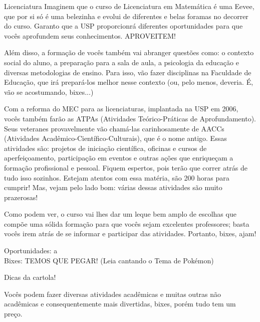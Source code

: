 \begin{subsecao}{Licenciatura}
Imaginem que o curso de Licenciatura em Matemática é uma
Eevee, que por si só é uma belezinha e evolui de diferentes e belas foramas
no decorrer do curso. Garanto que a USP proporcionrá diferentes oportunidades para
que vocês aprofundem seus conhecimentos. APROVEITEM!

Além disso, a formação de vocês também vai abranger questões como: o contexto
social do aluno, a preparação para a sala de aula, a psicologia da educação e
diversas metodologias de ensino. Para isso, vão fazer disciplinas na
Faculdade de Educação, que irá prepará-los melhor nesse contexto (ou, pelo
menos, deveria. É, vão se acostumando, bixes...)

Com a reforma do MEC para as licenciaturas, implantada na USP em 2006,
vocês também farão as ATPAs (Atividades Teórico-Práticas de Aprofundamento).
Seus veteranes provavelmente vão chamá-las carinhosamente de AACCs (Atividades
Acadêmico-Científico-Culturais), que é o nome antigo. Essas atividades são:
projetos de iniciação científica, oficinas e cursos de aperfeiçoamento,
participação em eventos e outras ações que enriqueçam a formação profissional e
pessoal. Fiquem espertos, pois terão que correr atrás de tudo isso sozinhos.
Estejam atentos com essa matéria, são 200 horas para cumprir! Mas, vejam pelo
lado bom: várias dessas atividades são muito prazerosas!

Como podem ver, o curso vai lhes dar um leque bem amplo de escolhas que
compõe uma sólida formação para que vocês sejam excelentes professores; basta 
vocês irem atrás de se informar e participar das atividades. Portanto, bixes, ajam!

Oportunidades: a
\\Bixes: TEMOS QUE PEGAR! (Leia cantando o Tema de Pokémon)

\begin{subsubsecao}{Dicas da cartola!}

Vocês podem fazer diversas atividades acadêmicas e muitas outras não acadêmicas e
consequentemente mais divertidas, bixes, porém tudo tem um preço.


\end{subsubsecao}
\end{subsecao}
